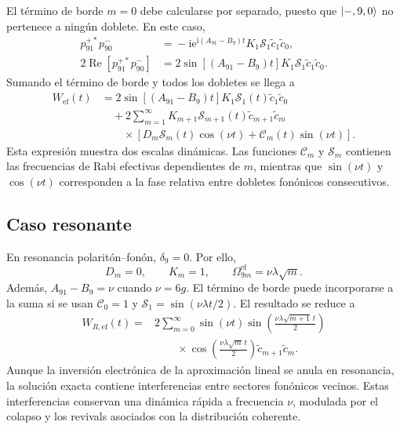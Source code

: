 \documentclass[11pt]{article}
\newcommand{\ii}{\mathrm{i}}
\newcommand{\ee}{\mathrm{e}}
\begin{document}
El t\'ermino de borde $m=0$ debe calcularse por separado, puesto que
$\ket{-,9,0}$ no pertenece a ning\'un doblete. En este caso,
\begin{align}
  p_{91}^{+*}p_{90}^-
  &={}
  -\ii
  \ee^{\ii(A_{91}-B_9)t}
  K_1\mathcal S_1\tilde c_1\tilde c_0,
  \\
  2\operatorname{Re}[p_{91}^{+*}p_{90}^-]
  &={}
  2\sin[(A_{91}-B_9)t]
  K_1\mathcal S_1\tilde c_1\tilde c_0.
\end{align}
Sumando el t\'ermino de borde y todos los dobletes se llega a
\begin{equation}
  \boxed{
  \begin{aligned}
  W_{\mathrm{ef}}(t)
  &={}
  2\sin[(A_{91}-B_9)t]
  K_1\mathcal S_1(t)\tilde c_1\tilde c_0
  \\
  &\quad+
  2\sum_{m=1}^{\infty}
  K_{m+1}\mathcal S_{m+1}(t)
  \tilde c_{m+1}\tilde c_m
  \\
  &\qquad\times
  [D_m\mathcal S_m(t)\cos(\nu t)
  +\mathcal C_m(t)\sin(\nu t)].
  \end{aligned}
  }
\end{equation}
Esta expresi\'on muestra dos escalas din\'amicas. Las funciones
$\mathcal C_m$ y $\mathcal S_m$ contienen las frecuencias de Rabi efectivas
dependientes de $m$, mientras que $\sin(\nu t)$ y $\cos(\nu t)$ corresponden
a la fase relativa entre dobletes fon\'onicos consecutivos.

\subsection{Caso resonante}

En resonancia polarit\'on--fon\'on, $\delta_9=0$. Por ello,
\begin{equation}
  D_m=0,
  \qquad
  K_m=1,
  \qquad
  \Omega_{9m}^{\mathrm{ef}}=\nu\lambda\sqrt m.
\end{equation}
Adem\'as, $A_{91}-B_9=\nu$ cuando $\nu=6g$. El t\'ermino de borde puede
incorporarse a la suma si se usan
$\mathcal C_0=1$ y
$\mathcal S_1=\sin(\nu\lambda t/2)$. El resultado se reduce a
\begin{equation}
  \boxed{
  \begin{aligned}
  W_{R,\mathrm{ef}}(t)
  ={}&
  2\sum_{m=0}^{\infty}
  \sin(\nu t)
  \sin\left(\frac{\nu\lambda\sqrt{m+1}\,t}{2}\right)
  \\
  &\qquad\times
  \cos\left(\frac{\nu\lambda\sqrt m\,t}{2}\right)
  \tilde c_{m+1}\tilde c_m.
  \end{aligned}
  }
\end{equation}
Aunque la inversi\'on electr\'onica de la aproximaci\'on lineal se anula en
resonancia, la soluci\'on exacta contiene interferencias entre sectores
fon\'onicos vecinos. Estas interferencias conservan una din\'amica r\'apida a
frecuencia $\nu$, modulada por el colapso y los revivals asociados con la
distribuci\'on coherente.
\end{document}
